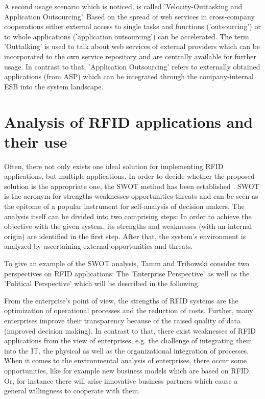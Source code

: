 A second usage scenario which is noticed, is called 'Velocity-Outtasking and Application Outsourcing'. Based on the spread of web services in cross-company cooperations either external access to single tasks and functions ('outsourcing') or to whole applications ('application outsourcing') can be accelerated. 
The term 'Outtalking' is used to talk about web services of external providers which can be incorporated to the own service repository and are centrally available for further usage. In contrast to that, 'Application Outsourcing' refers to externally obtained applications (from \ac{ASP}) which can be integrated through the company-internal ESB into the system landscape.

\section{Analysis of RFID applications and their use}

Often, there not only exists one ideal solution for implementing RFID applications, but multiple applications. In order to decide whether the proposed solution is the appropriate one, the \ac{SWOT} method has been established \cite[p.47 ff.]{fokus}. SWOT is the acronym for strengths-weaknesses-opportunities-threats and can be seen as the epitome of a popular instrument for self-analysis of decision makers. The analysis itself can be divided into two comprising steps: In order to achieve the objective with the given system, its strengths and weaknesses (with an internal origin) are identified in the first step. After that, the system's environment is analyzed by ascertaining external opportunities and threats. 

To give an example of the SWOT analysis, Tamm and Tribowski \cite[p.47 ff.]{fokus} consider two perspectives on RFID applications: The 'Enterprise Perspective' as well as the 'Political Perspective' which will be described in the following. 

From the enterprise's point of view, the strengths of RFID systems are the optimization of operational processes and the reduction of costs. Further, many enterprises improve their transparency because of the raised quality of data (improved decision making). In contrast to that, there exist weaknesses of RFID applications from the view of enterprises, e.g. the challenge of integrating them into the IT, the physical as well as the organizational integration of processes. When it comes to the environmental analysis of enterprises, there occur some opportunities, like for example new business models which are based on RFID. Or, for instance there will arise innovative business partners which cause a general willingness to cooperate with them. 

